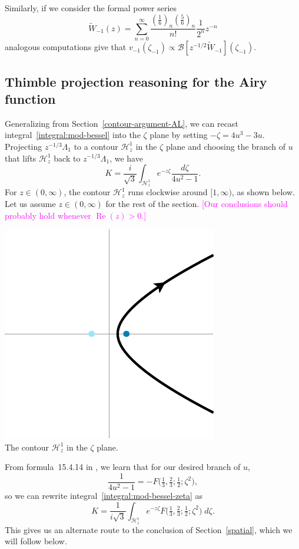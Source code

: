 \documentclass{article}
\newcommand{\borel}{\mathcal{B}}
\theoremstyle{definition}
\theoremstyle{plain}
\begin{document}
Similarly, if we consider the formal power series
\begin{equation}
\tilde{W}_{-1}(z)=\sum_{n=0}^{\infty}\frac{\left(\frac{1}{6}\right)_n\left(\frac{5}{6}\right)_n}{n!}\frac{1}{2^n}z^{-n}
\end{equation}
analogous computations give that $v_{-1}(\zeta_{-1})\propto\borel\left[z^{-1/2}\tilde{W}_{-1}\right](\zeta_{-1})$.
\subsection{Thimble projection reasoning for the Airy function}\label{contour-argument}
Generalizing from Section~\ref{contour-argument-AL}, we can recast integral~\eqref{integral:mod-bessel} into the $\zeta$ plane by setting $-\zeta = 4u^3 - 3u$. Projecting $z^{-1/3} \Lambda_1$ to a contour $\mathcal{H}^1_z$ in the $\zeta$ plane and choosing the branch of $u$ that lifts $\mathcal{H}^1_z$ back to $z^{-1/3} \Lambda_1$, we have
\begin{equation}\label{integral:mod-bessel-zeta}
K = \frac{i}{\sqrt{3}} \int_{\mathcal{H}^1_z} e^{-z\zeta}\frac{d\zeta}{4u^2 - 1}.
\end{equation}
For $z \in (0, \infty)$, the contour $\mathcal{H}^1_z$ runs clockwise around $[1, \infty)$, as shown below. Let us assume $z \in (0, \infty)$ for the rest of the section. \textcolor{magenta}{[Our conclusions should probably hold whenever $\operatorname{Re}(z) > 0$.]}
\begin{center}
\includegraphics{figures/zeta_contour_3.pdf} \\[1em]
{\small The contour $\mathcal{H}^1_z$ in the $\zeta$ plane.}
\end{center}
From formula~15.4.14 in \cite{dlmf}, we learn that for our desired branch of $u$,
\[ \frac{1}{4u^2 - 1} = -F\big(\tfrac{1}{3}, \tfrac{2}{3}; \tfrac{1}{2}; \zeta^2\big), \]
so we can rewrite integral~\eqref{integral:mod-bessel-zeta} as
\[ K = \frac{1}{i\sqrt{3}} \int_{\mathcal{H}^1_z} e^{-z\zeta} F\big(\tfrac{1}{3}, \tfrac{2}{3}; \tfrac{1}{2}; \zeta^2\big)\;d\zeta. \]
This gives us an alternate route to the conclusion of Section~\ref{spatial}, which we will follow below.
\end{document}
